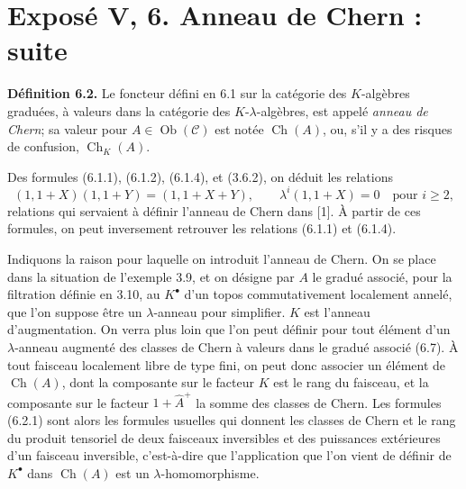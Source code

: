 \documentclass[11pt]{article}
\newcommand{\Gr}{\operatorname{Gr}}
\newcommand{\Fil}{\operatorname{Fil}}
\providecommand{\Gr}{\operatorname{Gr}}
\providecommand{\Gr}{\operatorname{G}}
\begin{document}
\providecommand{\Ghat}{\widehat G}
\providecommand{\Aqhat}{\widehat A_{\mathbb Q}}
\providecommand{\Ch}{\operatorname{Ch}}
\providecommand{\Log}{\operatorname{Log}}
\providecommand{\id}{\operatorname{id}}
\providecommand{\gr}{\operatorname{gr}}
\providecommand{\Hom}{\operatorname{Hom}}
\providecommand{\epsi}{\varepsilon}
\providecommand{\clgr}{\operatorname{cl}}
\providecommand{\Fil}{\operatorname{Fil}}
\providecommand{\Gr}{\operatorname{Gr}}
\providecommand{\Sym}{\operatorname{Sym}}


\section*{Exposé V, 6. Anneau de Chern : suite}

\textbf{Définition 6.2.} Le foncteur défini en 6.1 sur la catégorie des \(K\)-algèbres graduées, à valeurs dans la catégorie des \(K\)-\(\lambda\)-algèbres, est appelé \emph{anneau de Chern}; sa valeur pour \(A\in\operatorname{Ob}(\mathscr C)\) est notée \(\Ch(A)\), ou, s'il y a des risques de confusion, \(\Ch_K(A)\).

Des formules (6.1.1), (6.1.2), (6.1.4), et (3.6.2), on déduit les relations
\begin{equation}\tag{6.2.1}
 (1,1+X)(1,1+Y)=(1,1+X+Y),
 \qquad
 \lambda^i(1,1+X)=0\quad\text{pour }i\ge2,
\end{equation}
relations qui servaient à définir l'anneau de Chern dans [1]. À partir de ces formules, on peut inversement retrouver les relations (6.1.1) et (6.1.4).

Indiquons la raison pour laquelle on introduit l'anneau de Chern. On se place dans la situation de l'exemple 3.9, et on désigne par \(A\) le gradué associé, pour la filtration définie en 3.10, au \(K^\bullet\) d'un topos commutativement localement annelé, que l'on suppose être un \(\lambda\)-anneau pour simplifier. \(K\) est l'anneau d'augmentation. On verra plus loin que l'on peut définir pour tout élément d'un \(\lambda\)-anneau augmenté des classes de Chern à valeurs dans le gradué associé (6.7). À tout faisceau localement libre de type fini, on peut donc associer un élément de \(\Ch(A)\), dont la composante sur le facteur \(K\) est le rang du faisceau, et la composante sur le facteur \(1+\widehat A^+\) la somme des classes de Chern. Les formules (6.2.1) sont alors les formules usuelles qui donnent les classes de Chern et le rang du produit tensoriel de deux faisceaux inversibles et des puissances extérieures d'un faisceau inversible, c'est-à-dire que l'application que l'on vient de définir de \(K^\bullet\) dans \(\Ch(A)\) est un \(\lambda\)-homomorphisme.
\end{document}
